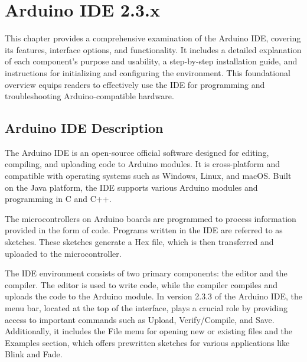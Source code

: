 %
%
%


\chapter{Arduino IDE 2.3.x}\label{ArduinoIDE2}



This chapter provides a comprehensive examination of the Arduino IDE, covering its features, interface options, and functionality. It includes a detailed explanation of each component’s purpose and usability, a step-by-step installation guide, and instructions for initializing and configuring the environment. This foundational overview equips readers to effectively use the IDE for programming and troubleshooting Arduino-compatible hardware.


\section{Arduino IDE Description}\label{ArduinoIDE}

The Arduino IDE is an open-source official software designed for editing, compiling, and uploading code to Arduino modules. It is cross-platform and compatible with operating systems such as Windows, Linux, and macOS. Built on the Java platform, the IDE supports various Arduino modules and programming in C and C++.

The microcontrollers on Arduino boards are programmed to process information provided in the form of code. Programs written in the IDE are referred to as sketches. These sketches generate a Hex file, which is then transferred and uploaded to the microcontroller.

The IDE environment consists of two primary components: the editor and the compiler. The editor is used to write code, while the compiler compiles and uploads the code to the Arduino module.\cite{Fezari:2018} In version 2.3.3 of the Arduino IDE, the menu bar, located at the top of the interface, plays a crucial role by providing access to important commands such as Upload, Verify/Compile, and Save. Additionally, it includes the File menu for opening new or existing files and the Examples section, which offers prewritten sketches for various applications like Blink and Fade.






